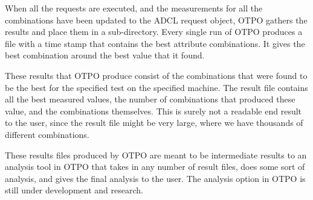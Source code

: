 When all the requests are executed, and the measurements for all the
combinations have been updated to the ADCL request object, OTPO gathers the
results and place them in a sub-directory. Every single run of OTPO produces a
file with a time stamp that contains the best attribute combinations. It gives
the best combination around the best value that it found. 

These results that OTPO produce consist of the combinations that
were found to be the best for the specified test on the specified machine. The
result file contains all the best measured values, the number of combinations that
produced these value, and the combinations themselves. This is surely not a
readable end result to the user, since the result file might be very large,
where we have thousands of different combinations. 

These results files produced by OTPO are meant to be intermediate results to
an analysis tool in OTPO that takes in any number of result files, does some
sort of analysis, and gives the final analysis to the user. The analysis
option in OTPO is still under development and research.

